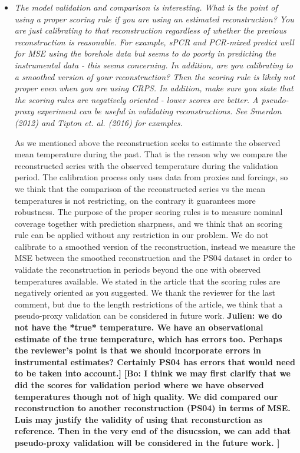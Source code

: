 \documentclass[11pt]{article}
\newcommand{\bl}[1]{\color{red}\textbf{[Bo: #1]}\normalcolor}
\newcommand{\jeg}[1]{\color{blue}\textbf{Julien: #1]}\normalcolor}
\begin{document}
\begin{itemize}
  
\item \textit{The model validation and comparison is interesting. What is the
    point of using a proper scoring rule if you are using an estimated reconstruction? You are just calibrating to that reconstruction regardless of
whether the previous reconstruction is reasonable. For example, sPCR and
PCR-mixed predict well for MSE using the borehole data but seems to do poorly in
predicting the instrumental data - this seems concerning. In addition, are you
calibrating to a smoothed version of your reconstruction? Then the scoring rule
is likely not proper even when you are using CRPS. In addition, make sure you
state that the scoring rules are negatively oriented - lower scores are better.
A pseudo-proxy experiment can be useful in validating reconstructions. See Smerdon (2012) and Tipton et. al. (2016) for examples.
}

As we mentioned above the reconstruction seeks to estimate the observed mean
temperature during the past. That is the reason why we compare the reconstructed
series with the observed temperature during the validation period. The
calibration process only uses data from proxies and forcings, so we think that
the comparison of the reconstructed series vs the mean temperatures is not
restricting, on the contrary it guarantees more robustness. The purpose of the
proper scoring rules is to measure nominal coverage together with prediction
sharpness, and we think that an scoring rule can be applied without any
restriction in our problem. We do not calibrate to a smoothed version of the
reconstruction, instead we measure the MSE between the smoothed reconstruction
and the PS04 dataset in order to validate the reconstruction in periods beyond
the one with observed temperatures available. We stated in the article that the scoring rules
are negatively oriented as you suggested. We thank the reviewer for the last
comment, but due to the length restrictions of the
article, we think that a pseudo-proxy validation can be considered in future
work. 
\jeg{we do not have the *true* temperature. We have an observational estimate of the true temperature, which has errors too. Perhaps the reviewer's point is that we should incorporate errors in instrumental estimates? Certainly PS04 has errors that would need to be taken into account.}
\bl{I think we may first clarify that we did the scores for validation period where we have observed temperatures though not of high quality. We did compared our reconstruction to another reconstruction (PS04) in terms of MSE. Luis may justify the validity of using that reconsturction as reference. Then in the very end of the disucssion, we can add that pseudo-proxy validation will be considered in the future work. }


\end{itemize}
\end{document}
